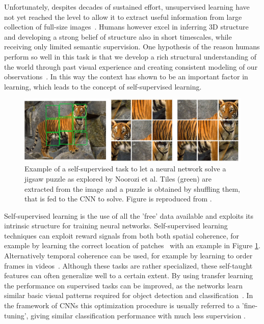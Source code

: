 Unfortunately, despites decades of sustained effort, unsupervised learning have not yet reached the level to allow it to extract useful information from large collection of full-size images~\cite{doersch2015}. Humans however excel in inferring 3D structure and developing a strong belief of structure also in short timescales, while receiving only limited semantic supervision. One hypothesis of the reason humans perform so well in this task is that we develop a rich structural understanding of the world through past visual experience and creating consistent modeling of our observations~\cite{zhou2017}. In this way the context has shown to be an important factor in learning, which leads to the concept of self-supervised learning.

\begin{figure}[t]
\centering
\includegraphics[width=\textwidth]{images/jigsaw_puzzle.png}
\caption{Example of a self-supervised task to let a neural network solve a jigsaw puzzle as explored by Noorozi et al\cite{noroozi2016}. Tiles (green) are extracted from the image and a puzzle is obtained by shuffling them, that is fed to the CNN to solve. Figure is reproduced from \cite{noroozi2016}.}
\label{fig:jigsaw}
\end{figure}

Self-supervised learning is the use of all the 'free' data available and exploits its intrinsic structure for training neural networks. Self-supervised learning techniques can exploit reward signals from both both spatial coherence, for example by learning the correct location of patches~\cite{doersch2015, noroozi2016} with an example in Figure \ref{fig:jigsaw}. Alternatively temporal coherence can be used, for example by learning to order frames in videos~\cite{misra2016, lee2017}. Although these tasks are rather specialized, these self-taught features can often generalize well to a certain extent. By using transfer learning the performance on supervised tasks can be improved, as the networks learn similar basic visual patterns required for object detection and classification~\cite{raina2007}. In the framework of CNNs this optimization procedure is usually referred to a 'fine-tuning', giving similar classification performance with much less supervision \needref.

